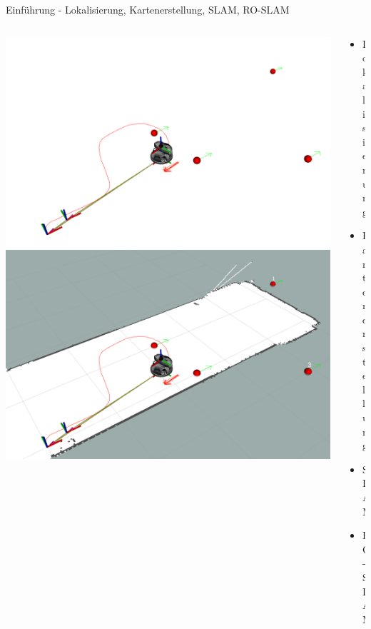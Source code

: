 \documentclass{beamer}
\begin{document}
\begin{frame}{Einführung - Lokalisierung, Kartenerstellung, SLAM, RO-SLAM}
\begin{columns}
\begin{column}{0.5\linewidth}
\begin{overlayarea}{\textwidth}{.35\textheight}
{				}
				\only<4>
				{
					\includegraphics[width=\linewidth]{intro_roslam1}
				}
				\only<5>
				{
					\includegraphics[width=\linewidth]{intro_roslam2}
				}
			\end{overlayarea}
		\end{column}
		\begin{column}{0.5\linewidth}
			\begin{itemize}
				\item<1-> Lokalisierung
				\item<2-> Kartenerstellung
				\item<3-> SLAM
				\item<4-> RO-SLAM
			\end{itemize}
		\end{column}
	\end{columns}
\end{frame}
\end{document}
